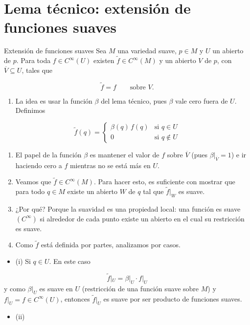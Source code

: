 \section{Lema técnico: extensión de funciones suaves}
\begin{booklemma}{Extensión de funciones suaves}
Sea $M$ una variedad suave, $p\in M$ y $U$ un abierto de $p$. Para toda $f\in C^\infty(U)$ existen $\widetilde{f}\in C^\infty(M)$ y un abierto $V$ de $p$, con $\overline{V}\subseteq U$, tales que

\[
\widetilde{f}=f\qquad\text{sobre }V.
\]
\end{booklemma}
\begin{bookproof}{}
\begin{enumerate}
\item La idea es usar la función $\beta$ del lema técnico, pues $\beta$ vale cero fuera de $U$. Definimos
\end{enumerate}
\[
\tilde f(q)=\begin{cases}\beta (q)\,f(q) & \text{si } q\in U\\0 & \text{si } q\notin U\end{cases}
\]
\begin{enumerate}[start=2]
\item El papel de la función $\beta$ es mantener el valor de $f$ sobre $\overline V$ (pues $\beta|_{\overline V}=1$) e ir haciendo cero a $f$ mientras no se está más en $U$.
\item Veamos que $\tilde f\in C^\infty(M)$. Para hacer esto, es suficiente con mostrar que para todo $q\in M$ existe un abierto $W$ de $q$ tal que $\tilde f|_W$ es suave.
\item ¿Por qué? Porque la suavidad es una propiedad local: una función es suave $(C^{\infty})$ si alrededor de cada punto existe un abierto en el cual su restricción es suave.
\item Como $\tilde f$ está definida por partes, analizamos por casos.
\end{enumerate}
\begin{itemize}
\item (i) Si $q\in U$. En este caso
\end{itemize}
\[
\tilde f|_U=\beta |_U\cdot f|_U
\]
y como $\beta|_U$ es suave en $U$ (restricción de una función suave sobre $M$) y $f|_U=f\in C^\infty(U)$, entonces $\tilde f|_U$ es suave por ser producto de funciones suaves.

\begin{itemize}
\item (ii)


\end{itemize}
\end{bookproof}
